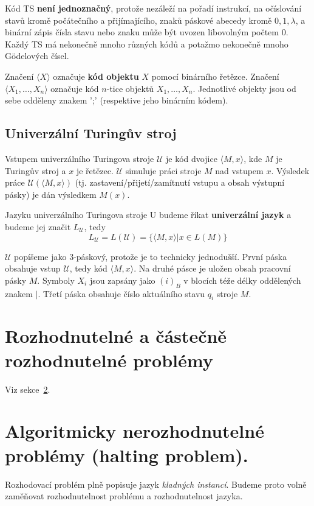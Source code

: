 \documentclass[11pt]{report} %
\numberwithin{equation}{section}
\begin{document}
Kód TS \textbf{není jednoznačný}, protože nezáleží na pořadí instrukcí, na očíslování stavů kromě počátečního a přijímajícího, znaků páskové abecedy kromě $0, 1, \lambda$, a binární zápis čísla stavu nebo znaku může být uvozen
libovolným počtem 0. Každý TS má nekonečně mnoho různých kódů a potažmo nekonečně mnoho Gödelových čísel.

Značení $\langle X \rangle$ označuje \textbf{kód objektu} $X$ pomocí binárního řetězce. Značení $\langle X_1, \dots, X_n\rangle$ označuje kód $n$-tice objektů $X_1, \dots, X_n$. Jednotlivé objekty jsou od sebe odděleny znakem ';' (respektive jeho binárním kódem).

\subsection{Univerzální Turingův stroj}
Vstupem univerzálního Turingova stroje $\mathcal{U}$ je kód dvojice $\langle M, x \rangle$, kde $M$ je Turingův stroj a $x$ je řetězec. $\mathcal{U}$ simuluje práci stroje $M$ nad vstupem $x$. Výsledek práce $\mathcal{U}(\langle M, x \rangle)$ (tj. zastavení/přijetí/zamítnutí vstupu a obsah výstupní pásky) je dán výsledkem $M(x)$.

Jazyku univerzálního Turingova stroje U budeme říkat \textbf{univerzální jazyk} a budeme jej značit $L_\mathcal{U}$, tedy
$$L_\mathcal{U} = L(\mathcal{U}) = \{\langle M, x \rangle | x \in L(M)\}$$

$\mathcal{U}$ popíšeme jako 3-páskový, protože je to technicky jednodušší. První páska obsahuje vstup $\mathcal{U}$, tedy kód $\langle M, x \rangle$. Na druhé pásce je uložen obsah pracovní pásky $M$. Symboly $X_i$ jsou zapsány jako $(i)_B$ v blocích téže délky oddělených znakem $|$. Třetí páska obsahuje číslo aktuálního stavu $q_i$ stroje $M$.



\section{Rozhodnutelné a částečně rozhodnutelné problémy}
Viz sekce~\ref{sec:halting}.



\section{Algoritmicky nerozhodnutelné problémy (halting problem).}
\label{sec:halting}

Rozhodovací problém plně popisuje jazyk \textit{kladných instancí}. Budeme proto volně zaměňovat rozhodnutelnost problému a rozhodnutelnost jazyka.
\end{document}
